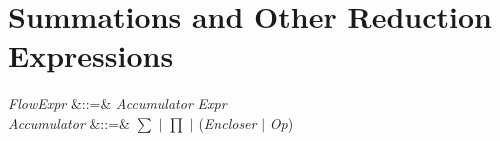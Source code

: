 %
%
%
%

\section{Summations and Other Reduction Expressions}

\begin{Grammar}
\emph{FlowExpr} &::=&
\emph{Accumulator} 
 \emph{Expr} \\

\emph{Accumulator} &::=& $\sum$ $|$ $\prod$ $|$  (\emph{Encloser} $|$ \emph{Op})
\end{Grammar}

